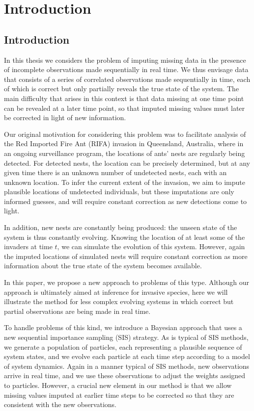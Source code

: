 \chapter[Introduction]{Introduction}
\label{ch:Introduction}

\section{Introduction}

In this thesis we considers the problem of imputing missing data in the presence of incomplete observations made sequentially in real time. We thus envisage data that consists of a series of correlated observations made sequentially in time, each of which is correct but only partially reveals the true state of the system. The main difficulty that arises in this context is that data missing at one time point can be revealed at a later time point, so that imputed missing values must later be corrected in light of new information.

Our original motivation for considering this problem was to facilitate analysis of the Red Imported Fire Ant (RIFA) invasion in Queensland, Australia, where in an ongoing surveillance program, the locations of ants’ nests are regularly being detected. For detected nests, the location can be precisely determined, but at any given time there is an unknown number of undetected nests, each with an unknown location. To infer the current extent of the invasion, we aim to impute plausible locations of undetected individuals, but these imputations are only informed guesses, and will require constant correction as new detections come to light.

In addition, new nests are constantly being produced: the unseen state of the system is thus constantly evolving. Knowing the location of at least some of the invaders at time $t$, we can simulate the evolution of this system. However, again the imputed locations of simulated nests will require constant correction as more information about the true state of the system becomes available.

In this paper, we propose a new approach to problems of this type. Although our approach is ultimately aimed at inference for invasive species, here we will illustrate the method for less complex evolving systems in which correct but partial observations are being made in real time.

To handle problems of this kind, we introduce a Bayesian approach that uses a new sequential importance sampling (SIS) strategy. As is typical of SIS methods, we generate a population of particles, each representing a plausible sequence of system states, and we evolve each particle at each time step according to a model of system dynamics. Again in a manner typical of SIS methods, new observations arrive in real time, and we use these observations to adjust the weights assigned to particles. However, a crucial new element in our method is that we allow missing values imputed at earlier time steps to be corrected so that they are consistent with the new observations.

